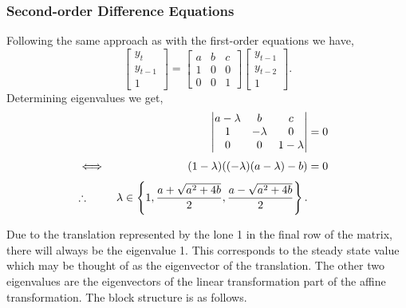 \documentclass[MathsNotesBase.tex]{subfiles}
\begin{document}
{		\subsubsection{Second-order Difference Equations}
		Following the same approach as with the first-order equations we have,
		\[
			\begin{bmatrix}y_t\\y_{t-1}\\1\end{bmatrix} =
			\begin{bmatrix}
				a & b & c\\
				1 & 0 & 0\\
				0 & 0 & 1
			\end{bmatrix}
			\begin{bmatrix}y_{t-1}\\y_{t-2}\\1\end{bmatrix}.
		\]
		Determining eigenvalues we get,
		\begin{align*}
		&&	\begin{vmatrix}
				a-\lambda & b & c\\
				1 & -\lambda & 0\\
				0 & 0 & 1-\lambda
			\end{vmatrix} &= 0 \\[3pt]
		&\iff & (1-\lambda)((-\lambda)(a-\lambda) - b) &= 0 &\text{\scriptsize{}} \\[3pt]
		&\therefore & \lambda \in \left\{ 1, \frac{a + \sqrt{a^2 + 4b}}{2}, \frac{a - \sqrt{a^2 + 4b}}{2} \right\}.
		\end{align*}
		
		Due to the translation represented by the lone 1 in the final row of the matrix, there will always be the eigenvalue 1. This corresponds to the steady state value which may be thought of as the eigenvector of the translation. The other two eigenvalues are the eigenvectors of the linear transformation part of the affine transformation. The block structure is as follows.
		
}
\end{document}
